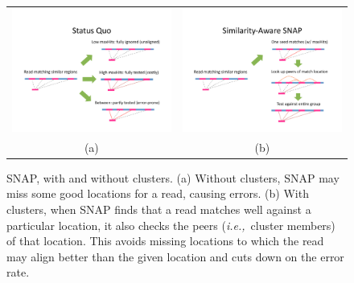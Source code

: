 \documentclass[twocolumn,10pt]{article}
\newcommand{\ie}{{\em i.e.,}~}
\begin{document}
\begin{figure}
\centering
\begin{tabular}{c c}
\includegraphics[scale=0.33]{snapWithoutClusters.pdf} & \includegraphics[scale=0.33]{simAwareSNAP.pdf}\\
(a) & (b)\\
\end{tabular}
\caption{SNAP, with and without clusters.  (a)  Without clusters, SNAP may miss some good locations for a read, causing errors.  (b)  With clusters, when SNAP finds that a read matches well against a particular location, it also checks the peers (\ie cluster members) of that location.  This avoids missing locations to which the read may align better than the given location and cuts down on the error rate.}
\label{fig:simAwareSNAP}
\end{figure}
\end{document}
